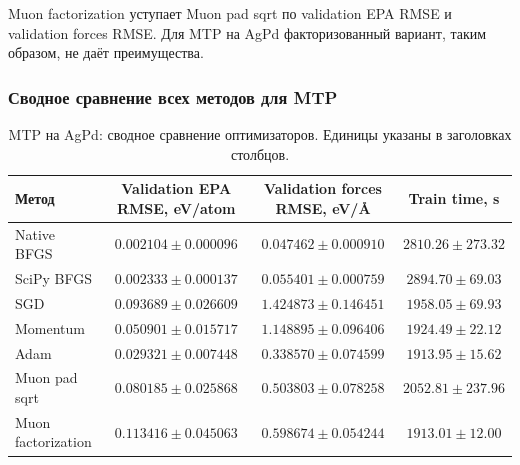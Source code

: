 
Muon factorization уступает Muon pad sqrt по validation EPA RMSE и validation forces RMSE. Для MTP на AgPd факторизованный вариант, таким образом, не даёт преимущества.

\FloatBarrier

\subsubsection{Сводное сравнение всех методов для MTP}

\begin{table}[H]
\centering
\small
\caption{MTP на AgPd: сводное сравнение оптимизаторов. Единицы указаны в заголовках столбцов.}
\label{tab:mtp-summary}
\begingroup
\setlength{\tabcolsep}{3pt}
\begin{tabular}{@{}lccc@{}}
\toprule
Метод & Validation EPA RMSE, eV/atom & Validation forces RMSE, eV/\AA & Train time, s \\
\midrule
Native BFGS & \(0.002104 \pm 0.000096\) & \(0.047462 \pm 0.000910\) & \(2810.26 \pm 273.32\) \\
SciPy BFGS & \(0.002333 \pm 0.000137\) & \(0.055401 \pm 0.000759\) & \(2894.70 \pm 69.03\) \\
SGD & \(0.093689 \pm 0.026609\) & \(1.424873 \pm 0.146451\) & \(1958.05 \pm 69.93\) \\
Momentum & \(0.050901 \pm 0.015717\) & \(1.148895 \pm 0.096406\) & \(1924.49 \pm 22.12\) \\
Adam & \(0.029321 \pm 0.007448\) & \(0.338570 \pm 0.074599\) & \(1913.95 \pm 15.62\) \\
Muon pad sqrt & \(0.080185 \pm 0.025868\) & \(0.503803 \pm 0.078258\) & \(2052.81 \pm 237.96\) \\
Muon factorization & \(0.113416 \pm 0.045063\) & \(0.598674 \pm 0.054244\) & \(1913.01 \pm 12.00\) \\
\bottomrule
\end{tabular}
\endgroup
\end{table}


